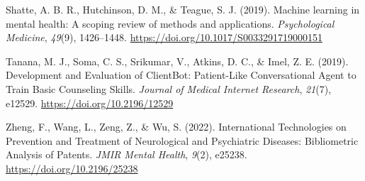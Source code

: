 \documentclass[
  man]{apa7}
\newlength{\cslhangindent}
\newlength{\cslentryspacingunit} %
\newenvironment{CSLReferences}[2] %
 {%
  \setlength{\parindent}{0pt}
  \ifodd #1
  \let\oldpar\par
  \def\par{\hangindent=\cslhangindent\oldpar}
  \fi
  \setlength{\parskip}{#2\cslentryspacingunit}
 }%
 {}
\begin{document}
\begin{CSLReferences}{1}{0}
\leavevmode{}%
Shatte, A. B. R., Hutchinson, D. M., \& Teague, S. J. (2019). Machine learning in mental health: A scoping review of methods and applications. \emph{Psychological Medicine}, \emph{49}(9), 1426--1448. \url{https://doi.org/10.1017/S0033291719000151}

\leavevmode{}%
Tanana, M. J., Soma, C. S., Srikumar, V., Atkins, D. C., \& Imel, Z. E. (2019). Development and {Evaluation} of {ClientBot}: {Patient}-{Like} {Conversational} {Agent} to {Train} {Basic} {Counseling} {Skills}. \emph{Journal of Medical Internet Research}, \emph{21}(7), e12529. \url{https://doi.org/10.2196/12529}

\leavevmode{}%
Zheng, F., Wang, L., Zeng, Z., \& Wu, S. (2022). International {Technologies} on {Prevention} and {Treatment} of {Neurological} and {Psychiatric} {Diseases}: {Bibliometric} {Analysis} of {Patents}. \emph{JMIR Mental Health}, \emph{9}(2), e25238. \url{https://doi.org/10.2196/25238}

\end{CSLReferences}
\end{document}
